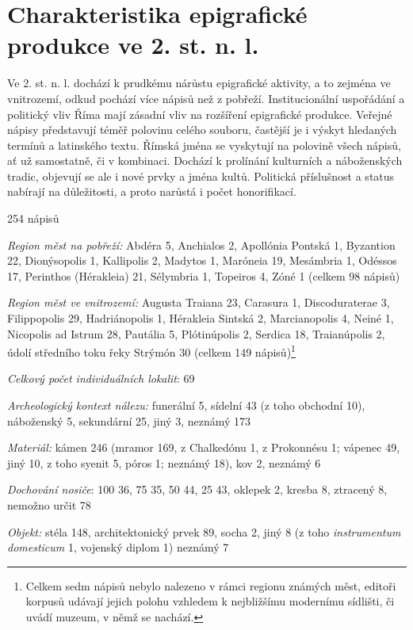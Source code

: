 
\section[charakteristika-epigrafické-produkce-ve-2.-st.-n.-l.]{Charakteristika epigrafické produkce ve 2. st. n. l.}

Ve 2. st. n. l. dochází k prudkému nárůstu epigrafické aktivity, a to zejména ve vnitrozemí, odkud pochází více nápisů než z pobřeží. Institucionální uspořádání a politický vliv Říma mají zásadní vliv na rozšíření epigrafické produkce. Veřejné nápisy představují téměř polovinu celého souboru, častější je i výskyt hledaných termínů a latinského textu. Římská jména se vyskytují na polovině všech nápisů, ať už samostatně, či v kombinaci. Dochází k prolínání kulturních a náboženských tradic, objevují se ale i nové prvky a jména kultů. Politická příslušnost a status nabírají na důležitosti, a proto narůstá i počet honorifikací.

\placetable[none]{}
\starttable[|l|]
\HL
{} 254 nápisů

{\em Region měst na pobřeží:} Abdéra 5, Anchialos 2, Apollónia Pontská 1, Byzantion 22, Dionýsopolis 1, Kallipolis 2, Madytos 1, Maróneia 19, Mesámbria 1, Odéssos 17, Perinthos (Hérakleia) 21, Sélymbria 1, Topeiros 4, Zóné 1 (celkem 98 nápisů)

{\em Region měst ve vnitrozemí:} Augusta Traiana 23, Carasura 1, Discoduraterae 3, Filippopolis 29, Hadriánopolis 1, Hérakleia Sintská 2, Marcianopolis 4, Neiné 1, Nicopolis ad Istrum 28, Pautália 5, Plótinúpolis 2, Serdica 18, Traianúpolis 2, údolí středního toku řeky Strýmón 30 (celkem 149 nápisů)\footnote{Celkem sedm nápisů nebylo nalezeno v rámci regionu známých měst, editoři korpusů udávají jejich polohu vzhledem k nejbližšímu modernímu sídlišti, či uvádí muzeum, v němž se nachází.}

{\em Celkový počet individuálních lokalit}: 69

{\em Archeologický kontext nálezu:} funerální 5, sídelní 43 (z toho obchodní 10), náboženský 5, sekundární 25, jiný 3, neznámý 173

{\em Materiál:} kámen 246 (mramor 169, z Chalkedónu 1, z Prokonnésu 1; vápenec 49, jiný 10, z toho syenit 5, póros 1; neznámý 18), kov 2, neznámý 6

{\em Dochování nosiče}: 100  36, 75  35, 50  44, 25  43, oklepek 2, kresba 8, ztracený 8, nemožno určit 78

{\em Objekt:} stéla 148, architektonický prvek 89, socha 2, jiný 8 (z toho {\em instrumentum domesticum} 1, vojenský diplom 1) neznámý 7

